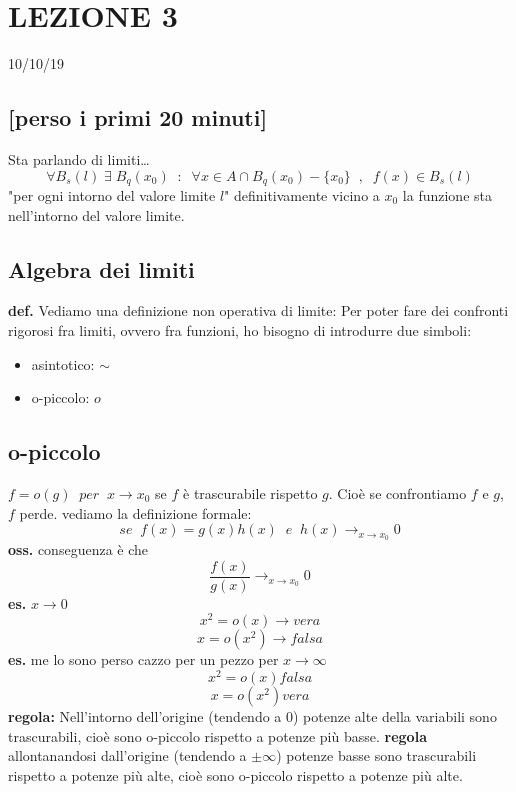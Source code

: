 \section*{LEZIONE 3}
10/10/19
\subsection*{[perso i primi 20 minuti]}
Sta parlando di limiti\dots
\newline
\[
    \forall B_s(l) \;\exists \; B_q(x_0) \;\;:\;\; \forall x\in A \cap B_q(x_0)-\{x_0\} \;\;,\;\;f(x) \in B_s(l)
\]
"per ogni intorno del valore limite $l$" definitivamente vicino a $x_0$ la funzione sta nell'intorno del valore limite.
\subsection*{Algebra dei limiti}
\textbf{def.} Vediamo una definizione non operativa di limite:
\newline
Per poter fare dei confronti rigorosi fra limiti, ovvero fra funzioni, ho bisogno di introdurre due simboli:
\newline
\begin{itemize}
    \item asintotico: $\sim$
    \item o-piccolo: $o$
\end{itemize}
\subsection*{o-piccolo}
$f = o(g) \;\;per \;\; x \rightarrow x_0$ se $f$ è trascurabile rispetto $g$. Cioè se confrontiamo $f$ e $g$, $f$ perde.
\newline
vediamo la definizione formale:
\[
    se \;\; f(x) = g(x)h(x) \;\; e \;\; h(x) \longrightarrow_{x\rightarrow x_0} 0
\]
\textbf{oss.} conseguenza è che
\[
    \frac{f(x)}{g(x)}\longrightarrow_{x\rightarrow x_0} 0
\]
\textbf{es.} $x\longrightarrow 0$ 
\[
    x^2 = o(x) \rightarrow vera
\]
\[
    x=o(x^2) \rightarrow falsa
\]
\textbf{es.} me lo sono perso cazzo per un pezzo
\newline
per $x\rightarrow \infty$
\[
    x^2 = o(x) falsa
\]
\[
    x=o(x^2) vera
\]
\textbf{regola:} Nell'intorno dell'origine (tendendo a $0$) potenze alte della variabili sono trascurabili, cioè sono o-piccolo rispetto a potenze più basse.
\newline
\textbf{regola} allontanandosi dall'origine (tendendo a $\pm \infty$)  potenze basse sono trascurabili rispetto a potenze più alte, cioè sono o-piccolo rispetto a potenze più alte.
\newline
